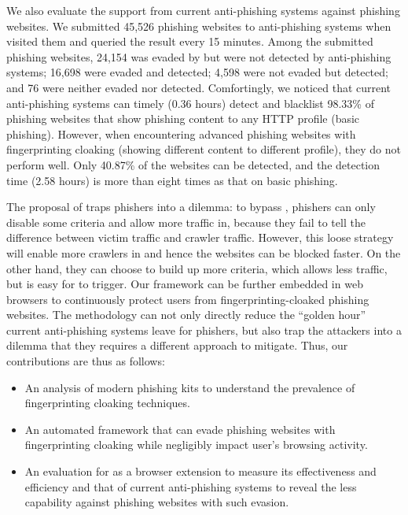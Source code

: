 We also evaluate the support from current anti-phishing systems against phishing websites.
We submitted 45,526 phishing websites to anti-phishing systems when \spartacus visited them and queried the result every 15 minutes.
Among the submitted phishing websites, 24,154 was evaded by \spartacus but were not detected by anti-phishing systems;
16,698 were evaded and detected;
4,598 were not evaded but detected;
and 76 were neither evaded nor detected.
Comfortingly, we noticed that current anti-phishing systems can timely (0.36 hours) detect and blacklist 98.33\% of phishing websites that show phishing content to any HTTP profile (basic phishing).
However, when encountering advanced phishing websites with fingerprinting cloaking (showing different content to different profile), they do not perform well.
Only 40.87\% of the websites can be detected, and the detection time (2.58 hours) is more than eight times as that on basic phishing.

The proposal of \spartacus traps phishers into a dilemma:
to bypass \spartacus, phishers can only disable some criteria and allow more traffic in, because they fail to tell the difference between victim traffic and crawler traffic.
However, this loose strategy will enable more crawlers in and hence the websites can be blocked faster.
On the other hand, they can choose to build up more criteria, which allows less traffic, but is easy for \spartacus to trigger.
Our \spartacus framework can be further embedded in web browsers to continuously protect users from fingerprinting-cloaked phishing websites.
The methodology can not only directly reduce the ``golden hour'' current anti-phishing systems leave for phishers,
but also trap the attackers into a dilemma that they requires a different approach to mitigate.
Thus, our contributions are thus as follows:

\begin{itemize}
    \item An analysis of modern phishing kits to understand the prevalence of fingerprinting cloaking techniques.
    \item An automated framework that can evade phishing websites with fingerprinting cloaking while negligibly impact user's browsing activity.
    \item An evaluation for \spartacus as a browser extension to measure its effectiveness and efficiency and that of current anti-phishing systems to reveal the less capability against phishing websites with such evasion.
\end{itemize}
